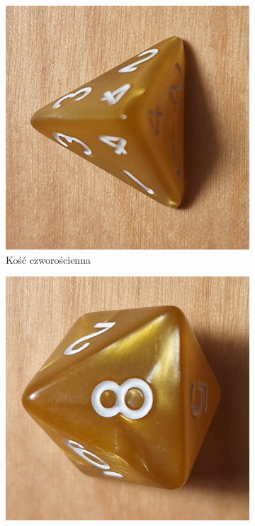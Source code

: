 \begin{figure}[h]
    \centering
      \begin{subfigure}{.3\textwidth}
        \includegraphics[width=.9\linewidth, angle=-90, clip]{chapters/02-teoria/figures/k4}
        \caption{\label{fig:k4}Kość czworościenna}
      \end{subfigure}%
      \begin{subfigure}{.3\textwidth}
        \includegraphics[width=.9\linewidth, angle=-90, clip]{chapters/02-teoria/figures/k8}

\end{subfigure}
\end{figure}
